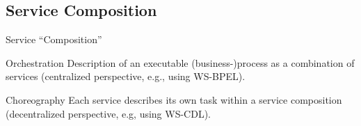 \subsection{Service Composition}
\begin{frame}{Service ``Composition''}
	\begin{mycolumns}[widths={50,50}]
		\begin{definition}{Orchestration}
			Description of an executable (business-)process as a combination of services (centralized perspective, e.g., using WS-BPEL).
		\end{definition}
		\begin{exampletight}{}
		\end{exampletight}
	\mynextcolumn
		\begin{definition}{Choreography}
			Each service describes its own task within a service composition (decentralized perspective, e.g, using WS-CDL).
		\end{definition}
		\begin{exampletight}{}
			\pic[width=\linewidth]{crossroad}
		\end{exampletight}
	\end{mycolumns}	
\end{frame}